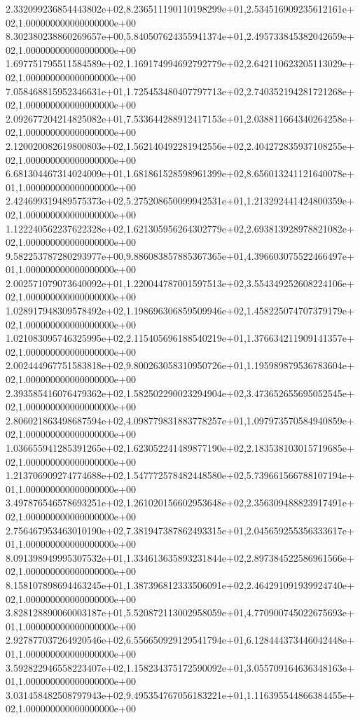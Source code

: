 2.332099236854443802e+02,8.236511190110198299e+01,2.534516909235612161e+02,1.000000000000000000e+00
8.302380238860269657e+00,5.840507624355941374e+01,2.495733845382042659e+02,1.000000000000000000e+00
1.697751795511584589e+02,1.169174994692792779e+02,2.642110623205113029e+02,1.000000000000000000e+00
7.058468815952346631e+01,1.725453480407797713e+02,2.740352194281721268e+02,1.000000000000000000e+00
2.092677204214825082e+01,7.533644288912417153e+01,2.038811664340264258e+02,1.000000000000000000e+00
2.120020082619800803e+02,1.562140492281942556e+02,2.404272835937108255e+02,1.000000000000000000e+00
6.681304467314024009e+01,1.681861528598961399e+02,8.656013241121640078e+01,1.000000000000000000e+00
2.424699319489575373e+02,5.275208650099942531e+01,1.213292441424800359e+02,1.000000000000000000e+00
1.122240562237622328e+02,1.621305956264302779e+02,2.693813928978821082e+02,1.000000000000000000e+00
9.582253787280293977e+00,9.886083857885367365e+01,4.396603075522466497e+01,1.000000000000000000e+00
2.002571079073640092e+01,1.220044787001597513e+02,3.554349252608224106e+02,1.000000000000000000e+00
1.028917948309578492e+02,1.198696306859509946e+02,1.458225074707379179e+02,1.000000000000000000e+00
1.021083095746325995e+02,2.115405696188540219e+01,1.376634211909141357e+02,1.000000000000000000e+00
2.002444967751583818e+02,9.800263058310950726e+01,1.195989879536783604e+02,1.000000000000000000e+00
2.393585416076479362e+02,1.582502290023294904e+02,3.473652655695052545e+02,1.000000000000000000e+00
2.806021863498687594e+02,4.098779831883778257e+01,1.097973570584940859e+02,1.000000000000000000e+00
1.036655941285391265e+02,1.623052241489877190e+02,2.183538103015719685e+02,1.000000000000000000e+00
1.213706909274774688e+02,1.547772578482448580e+02,5.739661566788107194e+01,1.000000000000000000e+00
3.497876546578693251e+02,1.261020156602953648e+02,2.356309488823917491e+02,1.000000000000000000e+00
2.756467953463010190e+02,7.381947387862493315e+01,2.045659255356333617e+01,1.000000000000000000e+00
8.091398949995307532e+01,1.334613635893231844e+02,2.897384522586961566e+02,1.000000000000000000e+00
8.158107898694463245e+01,1.387396812333506091e+02,2.464291091939924740e+02,1.000000000000000000e+00
3.828128890060003187e+01,5.520872113002958059e+01,4.770900745022675693e+01,1.000000000000000000e+00
2.927877037264920546e+02,6.556650929129541794e+01,6.128444373446042448e+01,1.000000000000000000e+00
3.592822946558223407e+02,1.158234375172590092e+01,3.055709164636348163e+01,1.000000000000000000e+00
3.031458482508797943e+02,9.495354767056183221e+01,1.116395544866384455e+02,1.000000000000000000e+00
